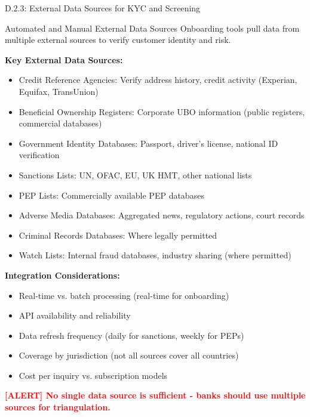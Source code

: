 \documentclass[11pt,a4paper]{beamer}
\newcommand{\redflag}[1]{\textcolor{red}{\textbf{[ALERT] #1}}}
\begin{document}
\begin{frame}{D.2.3: External Data Sources for KYC and Screening}
	\begin{block}{Automated and Manual External Data Sources}
		Onboarding tools pull data from multiple external sources to verify customer identity and risk.
	\end{block}
	\textbf{Key External Data Sources:}
	\begin{itemize}
		\item Credit Reference Agencies: Verify address history, credit activity (Experian, Equifax, TransUnion)
		\item Beneficial Ownership Registers: Corporate UBO information (public registers, commercial databases)
		\item Government Identity Databases: Passport, driver's license, national ID verification
		\item Sanctions Lists: UN, OFAC, EU, UK HMT, other national lists
		\item PEP Lists: Commercially available PEP databases
		\item Adverse Media Databases: Aggregated news, regulatory actions, court records
		\item Criminal Records Databases: Where legally permitted
		\item Watch Lists: Internal fraud databases, industry sharing (where permitted)
	\end{itemize}
	\textbf{Integration Considerations:}
	\begin{itemize}
		\item Real-time vs. batch processing (real-time for onboarding)
		\item API availability and reliability
		\item Data refresh frequency (daily for sanctions, weekly for PEPs)
		\item Coverage by jurisdiction (not all sources cover all countries)
		\item Cost per inquiry vs. subscription models
	\end{itemize}
	\redflag{No single data source is sufficient - banks should use multiple sources for triangulation.}
\end{frame}
\end{document}
